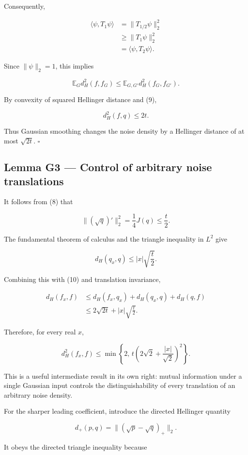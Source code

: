 \documentclass[11pt]{article}
\begin{document}
Consequently,

\[
\begin{aligned}
\langle\psi,T_1\psi\rangle
&=\|T_{1/2}\psi\|_2^2\\
&\geq\|T_1\psi\|_2^2\\
&=\langle\psi,T_2\psi\rangle.
\end{aligned}
\]

Since \(\|\psi\|_2=1\), this implies

\[
\mathbb E_G d_H^2(f,f_G)
\leq
\mathbb E_{G,G'}d_H^2(f_G,f_{G'}).
\]

By convexity of squared Hellinger distance and (9),

\[
\boxed{
d_H^2(f,q)\leq2t.
}
\tag{10}
\]

Thus Gaussian smoothing changes the noise density by a Hellinger distance of at most \(\sqrt{2t}\). \(\square\)

\subsection{Lemma G3 --- Control of arbitrary noise translations}

It follows from (8) that

\[
\|(\sqrt q)'\|_2^2
=\frac14J(q)
\leq\frac t2.
\]

The fundamental theorem of calculus and the triangle inequality in \(L^2\) give

\[
d_H(q_x,q)
\leq |x|\sqrt{\frac t2}.
\]

Combining this with (10) and translation invariance,

\[
\begin{aligned}
d_H(f_x,f)
&\leq d_H(f_x,q_x)
+d_H(q_x,q)+d_H(q,f)\\
&\leq2\sqrt{2t}+|x|\sqrt{\frac t2}.
\end{aligned}
\]

Therefore, for every real \(x\),

\[
\boxed{
d_H^2(f_x,f)
\leq
\min\left\{
2,\,
t\left(2\sqrt2+\frac{|x|}{\sqrt2}\right)^2
\right\}.
}
\tag{11}
\]

This is a useful intermediate result in its own right: mutual information under a single Gaussian input controls the distinguishability of every translation of an arbitrary noise density.

For the sharper leading coefficient, introduce the directed Hellinger quantity

\[
d_+(p,q)=\|(\sqrt p-\sqrt q)_+\|_2.
\]

It obeys the directed triangle inequality because
\end{document}
